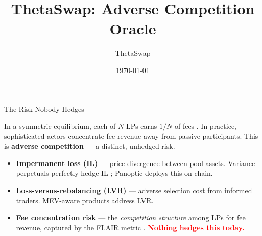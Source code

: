 \documentclass[aspectratio=169]{beamer}
\title{ThetaSwap: Adverse Competition Oracle}
\author{ThetaSwap}
\date{\today}
\newcommand{\PosCount}{N}
\begin{document}
\begin{frame}[plain]
\titlepage
\end{frame}

\begin{frame}{The Risk Nobody Hedges}

In a symmetric equilibrium, each of $\PosCount$ LPs earns $1/\PosCount$ of
fees \citep{macrapis2024permissionless}. In practice, sophisticated actors
concentrate fee revenue away from passive participants.
This is \textbf{adverse competition} --- a distinct, unhedged risk.

\bigskip

\begin{itemize}
  \item \textbf{Impermanent loss (IL)} --- price divergence between pool assets.
    Variance perpetuals perfectly hedge IL
    \citep{fukasawa2023weighted}; Panoptic deploys this on-chain.

  \item \textbf{Loss-versus-rebalancing (LVR)} --- adverse selection cost from
    informed traders. MEV-aware products address LVR.

  \item \textbf{Fee concentration risk} --- the \emph{competition structure}
    among LPs for fee revenue, captured by the FLAIR metric
    \citep{milionis2024flair}.
    \textcolor{red}{\textbf{Nothing hedges this today.}}
\end{itemize}

\end{frame}
\end{document}
